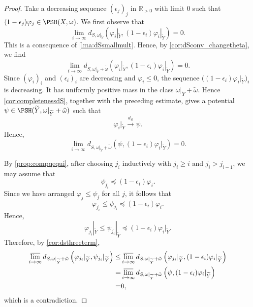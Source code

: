 \begin{proof}
Take a decreasing sequence $(\epsilon_j)_j$ in $\mathbb{R}_{>0}$ with limit $0$ such that $(1-\epsilon_j)\varphi_j\in \PSH(X,\omega)$. We first observe that
    \[
        \lim_{i\to\infty} d_{S,\omega|_{\widetilde{Y}}}\left(\varphi_i|_{\widetilde{Y}},(1-\epsilon_i)\varphi_i|_{\widetilde{Y}}\right)=0.
    \]
This is a consequence of \cref{lma:dSsmallmult}. Hence, by \cref{cor:dSconv_changetheta}, we find
\[
    \lim_{i\to\infty} d_{S,\omega|_{\widetilde{Y}}+\tilde{\omega}}\left(\varphi_i|_{\widetilde{Y}},(1-\epsilon_i)\varphi_i|_{\widetilde{Y}}\right)=0.
\]
Since $(\varphi_i)_i$ and $(\epsilon_i)_i$ are decreasing and $\varphi_i\leq 0$, the sequence $\bigl((1-\epsilon_i)\varphi_i|_{\widetilde{Y}}\bigr)_i$ is decreasing. It has uniformly positive mass in the class $\omega|_{\widetilde{Y}}+\tilde{\omega}$. Hence \cref{cor:completenessdS}, together with the preceding estimate, gives a potential $\psi\in \PSH(\widetilde{Y},\omega|_{\widetilde{Y}}+\tilde{\omega})$ such that
\[
\varphi_i|_{\widetilde{Y}}\xrightarrow{d_S}\psi.
\]
Hence,
\[
\lim_{i\to\infty} d_{S,\omega|_{\widetilde{Y}}+\tilde{\omega}}\left(\psi,(1-\epsilon_i)\varphi_i|_{\widetilde{Y}}\right)=0.
\]

By \cref{prop:compqequi}, after choosing $j_i$ inductively with $j_i\geq i$ and $j_i>j_{i-1}$, we may assume that
\[
    \psi_{j_i}\preceq (1-\epsilon_i)\varphi_i.
\]
Since we have arranged $\varphi_j\leq\psi_j$ for all $j$, it follows that
\[
    \varphi_{j_i}\leq\psi_{j_i}\preceq (1-\epsilon_i)\varphi_i.
\]
Hence,
\[
    \varphi_{j_i}|_{\widetilde{Y}}\leq \psi_{j_i}|_{\widetilde{Y}}\preceq (1-\epsilon_i)\varphi_i|_{\widetilde{Y}}.
\]
Therefore, by \cref{cor:dsthreeterm},
\[
    \begin{aligned}
       \varlimsup_{i\to\infty} d_{S,\omega|_{\widetilde{Y}}+\tilde{\omega}}\left(\varphi_{j_i}|_{\widetilde{Y}},\psi_{j_i}|_{\widetilde{Y}}\right)
     \leq & \varlimsup_{i\to\infty} d_{S,\omega|_{\widetilde{Y}}+\tilde{\omega}}\left(\varphi_{j_i}|_{\widetilde{Y}},(1-\epsilon_i)\varphi_i|_{\widetilde{Y}}\right)\\
     =& \varlimsup_{i\to\infty} d_{S,\omega|_{\widetilde{Y}}+\tilde{\omega}}\left(\psi,(1-\epsilon_i)\varphi_i|_{\widetilde{Y}}\right)\\
     = & 0,
     \end{aligned}
\]
which is a contradiction.
\end{proof}

